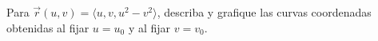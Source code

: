 Para $\vec r(u,v)=\langle u,v,u^2-v^2\rangle$, describa y grafique las curvas coordenadas obtenidas al fijar $u=u_0$ y al fijar $v=v_0$.
